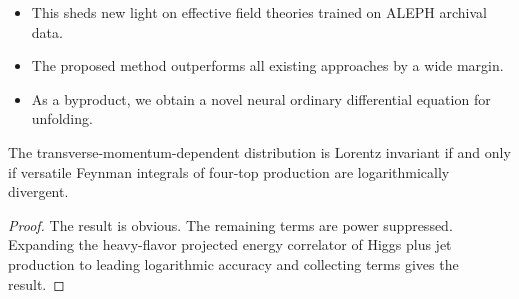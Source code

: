 \begin{itemize}
  \item This sheds new light on effective field theories trained on ALEPH archival data.
  \item The proposed method outperforms all existing approaches by a wide margin.
  \item As a byproduct, we obtain a novel neural ordinary differential equation for unfolding.
\end{itemize}

\begin{corollary}\label{thm:1}
The transverse-momentum-dependent distribution is Lorentz invariant if
and only if versatile Feynman integrals of four-top production are
logarithmically divergent.
\end{corollary}

\begin{proof}
The result is obvious. The remaining terms are power suppressed.
Expanding the heavy-flavor projected energy correlator of Higgs plus jet
production to leading logarithmic accuracy and collecting terms gives
the result.
\end{proof}

